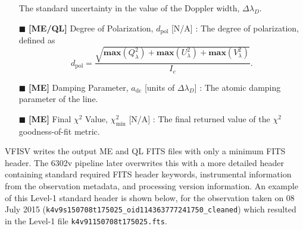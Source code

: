 \documentclass[11pt]{article}
\begin{document}
\begin{itemize}
        The standard uncertainty in the value of the Doppler width, $\Delta\lambda_{D}$.
  \item [\scriptsize$\blacksquare$] \textbf{[ME/QL]} Degree of Polarization, $d_{\mathrm{pol}}$ [N/A] : The degree
        of polarization, defined as
        \begin{equation}
        d_{\mathrm{pol}} = \frac{\sqrt{\mathrm{\mathbf{max}}\left(Q_{\lambda}^{2}\right) +
                                       \mathrm{\mathbf{max}}\left(U_{\lambda}^{2}\right) +
                                       \mathrm{\mathbf{max}}\left(V_{\lambda}^{2}\right)}}{I_{c}}.
        \end{equation}
  \item [\scriptsize$\blacksquare$] \textbf{[ME]} Damping Parameter, $a_{\mathrm{dc}}$ [units of $\Delta\lambda_{D}$] : The atomic
        damping parameter of the line.
  \item [\scriptsize$\blacksquare$] \textbf{[ME]} Final $\chi^{2}$ Value, $\chi^{2}_{\mathrm{min}}$ [N/A] : The
        final returned value of the $\chi^{2}$ goodness-of-fit metric.
\end{itemize}

VFISV writes the output ME and QL FITS files with only a minimum FITS header.  The \solisvsm 6302v pipeline
later overwrites this with a more detailed header containing standard required FITS header keywords,
instrumental information from the observation metadata, and processing version information.  An example of
this \solisvsm Level-1 standard header is shown below, for the observation taken on 08 July 2015
(\texttt{k4v9s150708t175025\_oid114363777241750\_cleaned}) which resulted in the Level-1 file
\texttt{k4v91150708t175025.fts}.
\end{document}
